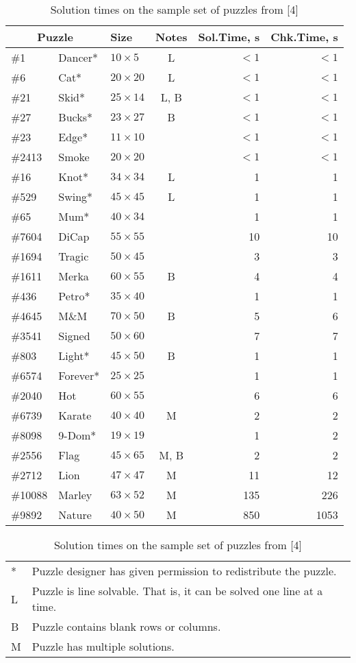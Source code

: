 \documentclass[11pt,draft]{article}
\begin{document}
\begin{table}
\caption{Solution times on the sample set of puzzles from [4]}
\begin{center}
\begin{tabular}{@{}lllcrr@{}}
\hline
\multicolumn{2}{c}{Puzzle}&Size&Notes&Sol.Time, s&Chk.Time, s\\
\hline
\#1&Dancer*    &$10\times 5$&L&$<1$&$<1$\\
\#6&Cat*       &$20\times 20$&L&$<1$&$<1$\\
\#21&Skid*     &$25\times 14$&L, B&$<1$&$<1$\\
\#27&Bucks*    &$23\times 27$&B&$<1$&$<1$\\
\#23&Edge*     &$11\times 10$&&$<1$&$<1$\\
\#2413&Smoke   &$20\times 20$&&$<1$&$<1$\\
\#16&Knot*     &$34\times 34$&L&1&1\\
\#529&Swing*   &$45\times 45$&L&1&1\\
\#65&Mum*      &$40\times 34$&&1&1\\
\#7604&DiCap   &$55\times 55$&&10&10\\
\#1694&Tragic  &$50\times 45$&&3&3\\
\#1611&Merka   &$60\times 55$&B&4&4\\
\#436&Petro*   &$35\times 40$&&1&1\\
\#4645&M\&M    &$70\times 50$&B&5&6\\
\#3541&Signed  &$50\times 60$&&7&7\\
\#803&Light*   &$45\times 50$&B&1&1\\
\#6574&Forever*&$25\times 25$&&1&1\\
\#2040&Hot     &$60\times 55$&&6&6\\
\#6739&Karate  &$40\times 40$&M&2&2\\
\#8098&9-Dom*  &$19\times 19$&&1&2\\
\#2556&Flag    &$45\times 65$&M, B&2&2\\
\#2712&Lion    &$47\times 47$&M&11&12\\
\#10088&Marley &$63\times 52$&M&135&226\\
\#9892&Nature  &$40\times 50$&M&850&1053\\
\hline
\end{tabular}

\begin{tabular}{@{}lp{102mm}@{}}
*&Puzzle designer has given permission to redistribute the puzzle.\\
L&Puzzle is line solvable. That is, it can be solved one line at a
time.\\
B&Puzzle contains blank rows or columns.\\
M&Puzzle has multiple solutions.\\
\end{tabular}
\end{center}
\end{table}
\end{document}

